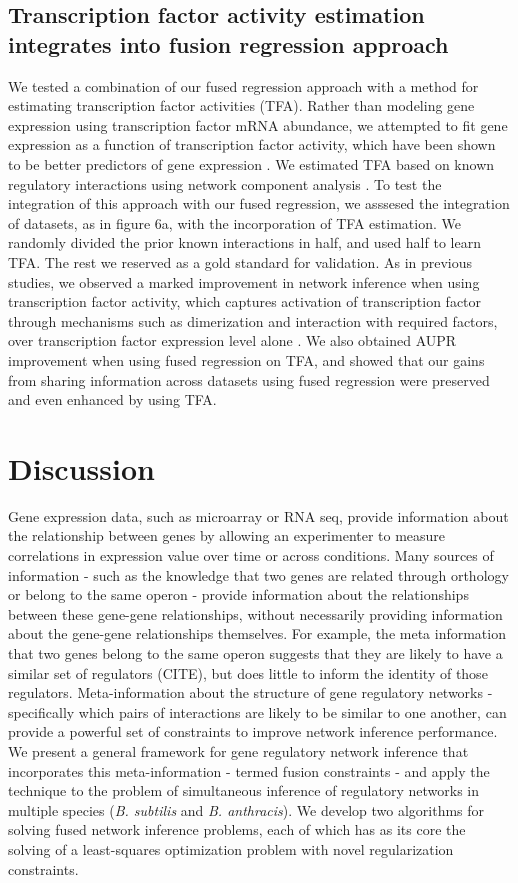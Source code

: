 \documentclass[11pt]{article}
\begin{document}
\subsection{Transcription factor activity estimation integrates into fusion regression approach}
We tested a combination of our fused regression approach with a method for estimating transcription factor activities (TFA). Rather than modeling gene expression using transcription factor mRNA abundance, we attempted to fit gene expression as a function of transcription factor activity, which have been shown to be better predictors of gene expression \cite{arrieta-ortiz_experimentally_2015}. We estimated TFA based on known regulatory interactions using network component analysis \cite{liao2003network}. To test the integration of this approach with our fused regression, we asssesed the integration of  datasets, as in figure 6a, with the incorporation of TFA estimation. We randomly divided the prior known interactions in half, and used half to learn TFA. The rest we reserved as a gold standard for validation. As in previous studies, we observed a marked improvement in network inference when using transcription factor activity, which captures activation of transcription factor through mechanisms such as dimerization and interaction with required factors, over transcription factor expression level alone \cite{fu_reconstructing_2011}. We also obtained AUPR improvement when using fused regression on TFA, and showed that our gains from sharing information across datasets using fused regression were preserved and even enhanced by using TFA. 

\section{Discussion}
Gene expression data, such as microarray or RNA seq, provide information about the relationship between genes by allowing an experimenter to measure correlations in expression value over time or across conditions. Many sources of information - such as the knowledge that two genes are related through orthology or belong to the same operon - provide information about the relationships between these gene-gene relationships, without necessarily providing information about the gene-gene relationships themselves. For example, the meta information that two genes belong to the same operon suggests that they are likely to have a similar set of regulators (CITE), but does little to inform the identity of those regulators. Meta-information about the structure of gene regulatory networks - specifically which pairs of interactions are  likely to be similar to one another, can provide a powerful set of constraints to improve network inference performance. We present a general framework for gene regulatory network inference that incorporates this meta-information - termed fusion constraints - and apply the technique to the problem of simultaneous inference of regulatory networks in multiple species (\textit{B. subtilis} and \textit{B. anthracis}). We develop two algorithms for solving fused network inference problems, each of which has as its core the solving of a least-squares optimization problem with novel regularization constraints.
\end{document}
